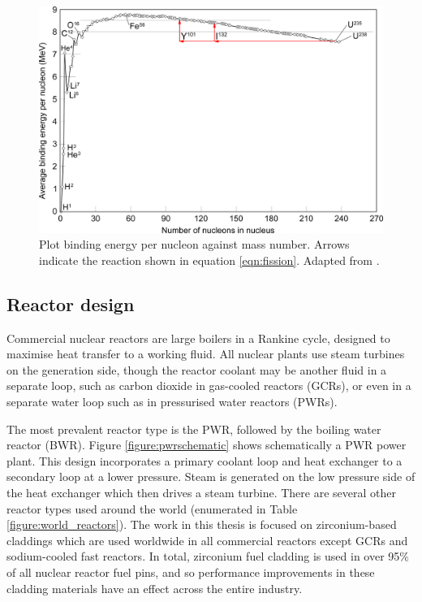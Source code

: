 \begin{figure}[ht]
\centering
\includegraphics[width=14cm]{images/Binding_energy_curve.png}
\caption[Plot binding energy per nucleon against mass number. Arrows indicate the reaction shown in equation \ref{eqn:fission}.]{Plot binding energy per nucleon against mass number. Arrows indicate the reaction shown in equation \ref{eqn:fission}. Adapted from \cite{Fastfission}.}
\label{figure:bindingenergy}
\end{figure}

\subsection{Reactor design} %

Commercial nuclear reactors are large boilers in a Rankine cycle, designed to maximise heat transfer to a working fluid. All nuclear plants use steam turbines on the generation side, though the reactor coolant may be another fluid in a separate loop, such as carbon dioxide in gas-cooled reactors (GCRs), or even in a separate water loop such as in pressurised water reactors (PWRs). 

The most prevalent reactor type is the PWR, followed by the boiling water reactor (BWR). Figure \ref{figure:pwrschematic} shows schematically a PWR power plant. This design incorporates a primary coolant loop and heat exchanger to a secondary loop at a lower pressure. Steam is generated on the low pressure side of the heat exchanger which then drives a steam turbine. There are several other reactor types used around the world (enumerated in Table \ref{figure:world_reactors}). The work in this thesis is focused on zirconium-based claddings which are used worldwide in all commercial reactors except GCRs and sodium-cooled fast reactors. In total, zirconium fuel cladding is used in over 95\% of all nuclear reactor fuel pins, and so performance improvements in these cladding materials have an effect across the entire industry.

